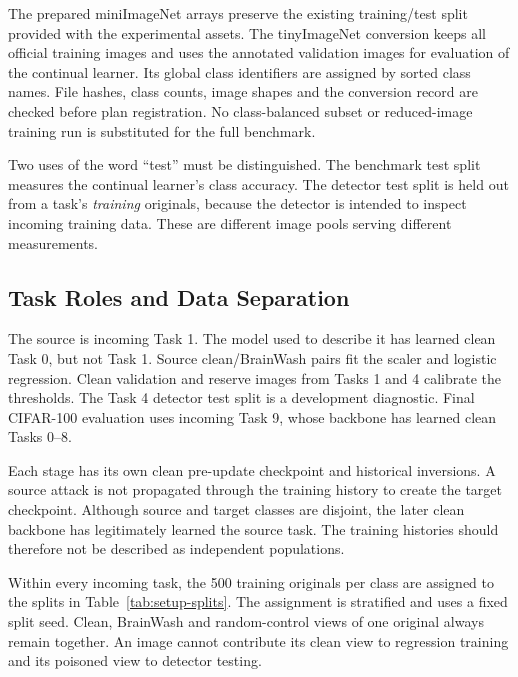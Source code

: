 The prepared miniImageNet arrays preserve the existing training/test split
provided with the experimental assets. The tinyImageNet conversion keeps
all official training images and uses the annotated validation images for
evaluation of the continual learner. Its global class identifiers are
assigned by sorted class names. File hashes, class counts, image shapes
and the conversion record are checked before plan registration. No
class-balanced subset or reduced-image training run is substituted for the
full benchmark.

Two uses of the word ``test'' must be distinguished. The benchmark test
split measures the continual learner's class accuracy. The detector test
split is held out from a task's \emph{training} originals, because the
detector is intended to inspect incoming training data. These are different
image pools serving different measurements.

\subsection{Task Roles and Data Separation}
\label{subsec:setup-task-roles}

The source is incoming Task 1. The model used to describe it has learned
clean Task 0, but not Task 1. Source clean/BrainWash pairs fit the scaler
and logistic regression. Clean validation and reserve images from Tasks 1
and 4 calibrate the thresholds. The Task 4 detector test split is a
development diagnostic. Final CIFAR-100 evaluation uses incoming Task 9,
whose backbone has learned clean Tasks 0--8.

Each stage has its own clean pre-update checkpoint and historical
inversions. A source attack is not propagated through the training history
to create the target checkpoint. Although source and target classes are
disjoint, the later clean backbone has legitimately learned the source
task. The training histories should therefore not be described as
independent populations.

Within every incoming task, the 500 training originals per class are
assigned to the splits in Table~\ref{tab:setup-splits}. The assignment is
stratified and uses a fixed split seed. Clean, BrainWash and random-control
views of one original always remain together. An image cannot contribute
its clean view to regression training and its poisoned view to detector
testing.

